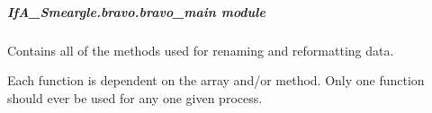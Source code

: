 \documentclass[letterpaper,10pt,english]{sphinxmanual}
\begin{document}
\subparagraph{IfA\_Smeargle.bravo.bravo\_main module}
\label{\detokenize{python_docstrings/IfA_Smeargle.bravo.bravo_main:module-IfA_Smeargle.bravo.bravo_main}}\label{\detokenize{python_docstrings/IfA_Smeargle.bravo.bravo_main:ifa-smeargle-bravo-bravo-main-module}}\label{\detokenize{python_docstrings/IfA_Smeargle.bravo.bravo_main::doc}}
Contains all of the methods used for renaming and reformatting data.

Each function is dependent on the array and/or method. Only one function
should ever be used for any one given process.
\end{document}
